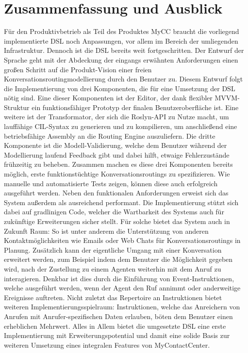 \chapter{Zusammenfassung und Ausblick}
Für den Produktivbetrieb als Teil des Produktes MyCC braucht die vorliegend implementierte DSL noch Anpassungen, vor allem im Bereich der umliegenden Infrastruktur. 
Dennoch ist die DSL bereits weit fortgeschritten. Der Entwurf der Sprache geht mit der Abdeckung der eingangs erwähnten Anforderungen einen großen Schritt auf die Produkt-Vision einer freien Konversationsroutingmodellierung durch den Benutzer zu. Diesem Entwurf folgt die Implementierung von drei Komponenten, die für eine Umsetzung der DSL nötig sind. Eine dieser Komponenten ist der Editor, der dank flexibler MVVM-Struktur ein funktionsfähiger Prototyp der finalen Benutzeroberfläche ist. Eine weitere ist der Transformator, der sich die Roslyn-API zu Nutze macht, um lauffähige CIL-Syntax zu generieren und zu kompilieren, um anschließend eine betriebsfähige Assembly an die Routing Engine auszuliefern. Die dritte Komponente ist die  Modell-Validierung, welche dem Benutzer während der Modellierung laufend Feedback gibt und dabei hilft, etwaige Fehlerzustände frühzeitig zu beheben. 
\newline
Zusammen machen es diese drei Komponenten bereits möglich, erste funktionstüchtige Konversationsroutings zu spezifizieren. Wie manuelle und automatisierte Tests zeigen, können diese auch erfolgreich ausgeführt werden. Neben den funktionalen Anforderungen erweist sich das System außerdem als ausreichend performant. Die Implementierung stützt sich dabei auf gradlinigen Code, welcher die Wartbarkeit des Systems auch für zukünftige Erweiterungen sicher stellt. 
\newline
Für solche bietet das System auch in Zukunft Raum: So ist unter anderem die Unterstützung von anderen Kontaktmöglichkeiten wie Emails oder Web Chats für Konversationsroutings in Planung. Zusätzlich kann der eigentliche Umgang mit einer Konversation erweitert werden, zum Beispiel indem dem Benutzer die Möglichkeit gegeben wird, nach der Zustellung zu einem Agenten weiterhin mit dem Anruf zu interagieren. Denkbar ist dies durch die Einführung von Event-Instruktionen, welche ausgeführt werden, wenn der Agent den Ruf annimmt oder anderweitige Ereignisse auftreten. Nicht zuletzt das Repertoire an Instruktionen bietet weiteren Implementierungsspielraum: Instruktionen, welche das Anreichern von Anrufen mit Anrufer-spezifischen Daten erlauben, böten dem Benutzer einen erheblichen Mehrwert. Alles in Allem bietet die umgesetzte DSL eine erste Implementierung mit Erweiterungspotential und damit eine solide Basis zur weiteren 
Umsetzung eines integralen Features von MyContactCenter.